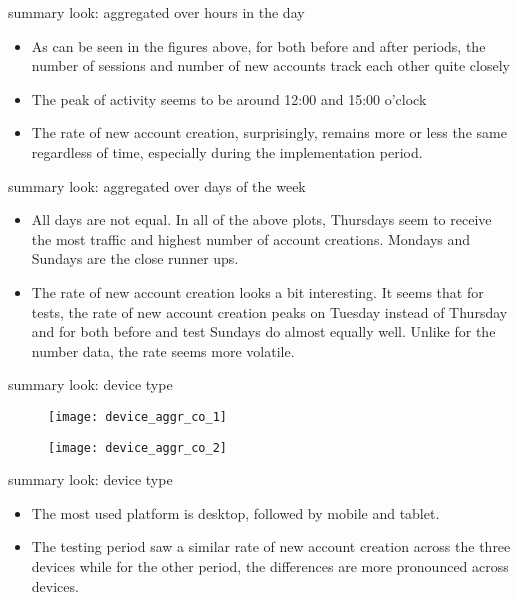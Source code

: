 \documentclass{beamer}
\begin{document}
		\begin{frame}{summary look: aggregated over hours in the day}
			\begin{itemize}
				\item As can be seen in the figures above, for both before and after periods, the number of sessions and number of new accounts track each other quite closely
				
				\item The peak of activity seems to be around 12:00 and 15:00 o'clock
				
				\item The rate of new account creation, surprisingly, remains more or less the same regardless of time, especially during the implementation period.
			\end{itemize}
		\end{frame}		
		
		\begin{frame}{summary look: aggregated over days of the week}
			\begin{itemize}
				\item All days are not equal. In all of the above plots, Thursdays seem to receive the most traffic and highest number of account creations. Mondays and Sundays are the close runner ups. 
				
				\item The rate of new account creation looks a bit interesting. It seems that for tests, the rate of new account creation peaks on Tuesday instead of Thursday and for both before and test Sundays do almost equally well. Unlike for the number data, the rate seems more volatile.
			\end{itemize}
		\end{frame}
		
		\begin{frame}{summary look: device type}
			\begin{figure}[H]
				\centering
				\texttt{[image: device\_aggr\_co\_1]}
			\end{figure}
			
			\begin{figure}[H]
				\centering
				\texttt{[image: device\_aggr\_co\_2]}
			\end{figure}
		\end{frame}
		
		\begin{frame}{summary look: device type}
			\begin{itemize}
				\item The most used platform is desktop, followed by mobile and tablet. 
				
				\item The testing period saw a similar rate of new account creation across the three devices while for the other period, the differences are more pronounced across devices.
			\end{itemize}
		\end{frame}			
		
\end{document}
